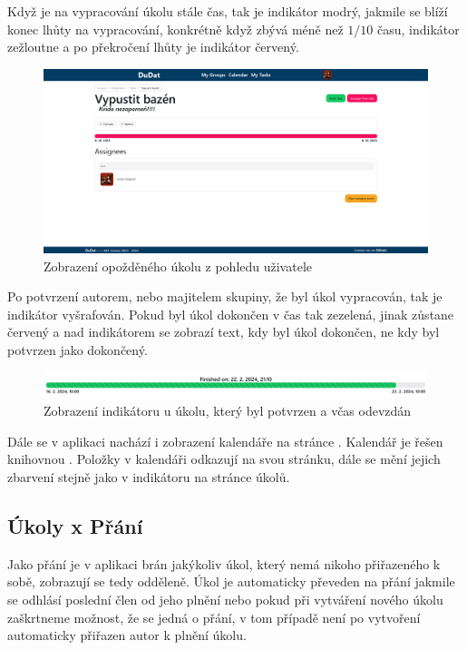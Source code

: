 Když je na vypracování úkolu stále čas, tak je indikátor modrý, jakmile se blíží konec lhůty na vypracování, konkrétně když zbývá méně než \(1/10\) času, indikátor zežloutne a po překročení lhůty je indikátor červený.

\begin{figure}[hbt!]
	\centering
	\includegraphics[width=1\linewidth]{img/opozdenyUkol.png}
	\caption{Zobrazení opožděného úkolu z pohledu uživatele}
\end{figure}

Po potvrzení autorem, nebo majitelem skupiny, že byl úkol vypracován, tak je indikátor vyšrafován. Pokud byl úkol dokončen v čas tak zezelená, jinak zůstane červený a nad indikátorem se zobrazí text, kdy byl úkol dokončen, ne kdy byl potvrzen jako dokončený.

\begin{figure}[hbt!]
	\centering
	\includegraphics[width=1\linewidth]{img/progressOnTime.png}
	\caption{Zobrazení indikátoru u úkolu, který byl potvrzen a včas odevzdán}
\end{figure}

Dále se v aplikaci nachází i zobrazení kalendáře na stránce . Kalendář je řešen knihovnou . Položky v kalendáři odkazují na svou stránku, dále se mění jejich zbarvení stejně jako v indikátoru na stránce úkolů.

\subsection{Úkoly x Přání}

Jako přání je v aplikaci brán jakýkoliv úkol, který nemá nikoho přiřazeného k sobě, zobrazují se tedy odděleně. Úkol je automaticky převeden na přání jakmile se odhlásí poslední člen od jeho plnění nebo pokud při vytváření nového úkolu zaškrtneme možnost, že se jedná o přání, v tom případě není po vytvoření automaticky přiřazen autor k plnění úkolu.

